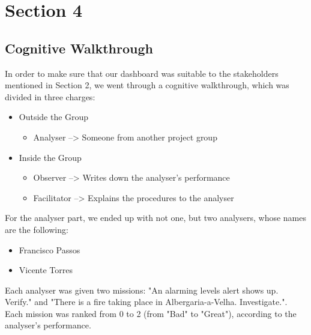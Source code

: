 \chapter{Section 4}
\section{Cognitive Walkthrough}
In order to make sure that our dashboard was suitable 
to the stakeholders mentioned in Section 2, we went 
through a cognitive walkthrough, which was divided in 
three charges: 
\begin{itemize}
    \item Outside the Group
    \begin{itemize}
    \item Analyser --> Someone from another project group 
    \end{itemize}
    \item Inside the Group
    \begin{itemize}
    \item Observer --> Writes down the analyser's performance
    \item Facilitator --> Explains the procedures to the 
    analyser
    \end{itemize}
\end{itemize} \par 
For the analyser part, we ended up with not one, but two 
analysers, whose names are the following:
\begin{itemize}
    \item Francisco Passos
    \item Vicente Torres
\end{itemize} \par
Each analyser was given two missions: "An alarming levels 
alert shows up. Verify." and "There is a fire taking place 
in Albergaria-a-Velha. Investigate.". Each mission was ranked 
from 0 to 2 (from "Bad" to "Great"), according to the 
analyser's performance. 
